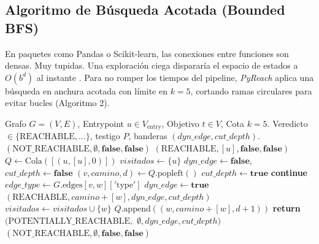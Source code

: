 \documentclass[conference]{IEEEtran}
\begin{document}
\subsection{Algoritmo de Búsqueda Acotada (Bounded BFS)}
En paquetes como Pandas o Scikit-learn, las conexiones entre funciones son densas. Muy tupidas. Una exploración ciega dispararía el espacio de estados a $O(b^d)$ al instante \cite{nielson1999principles}. Para no romper los tiempos del pipeline, \textit{PyReach} aplica una búsqueda en anchura acotada con límite en $k=5$, cortando ramas circulares para evitar bucles (Algoritmo 2).

\begin{algorithm}[t]
\caption{Búsqueda Acotada de Alcanzabilidad (\textit{Bounded BFS})}
\label{alg:bounded_bfs}
\begin{algorithmic}[1]
\REQUIRE Grafo $G=(V, E)$, Entrypoint $u \in V_{\text{entry}}$, Objetivo $t \in V$, Cota $k=5$.
\ENSURE Veredicto $\in \{\text{REACHABLE}, \dots\}$, testigo $P$, banderas $(\mathit{dyn\_edge}, \mathit{cut\_depth})$.
    \RETURN $(\text{NOT\_REACHABLE}, \emptyset, \mathbf{false}, \mathbf{false})$
\ENDIF
{}
    \RETURN $(\text{REACHABLE}, [u], \mathbf{false}, \mathbf{false})$
\ENDIF
\STATE $Q \leftarrow \text{Cola}([ (u, [u], 0) ])$
\STATE $\mathit{visitados} \leftarrow \{u\}$
\STATE $\mathit{dyn\_edge} \leftarrow \mathbf{false}$, $\mathit{cut\_depth} \leftarrow \mathbf{false}$
    \STATE $(v, \mathit{camino}, d) \leftarrow Q.\text{popleft}()$
            \STATE $\mathit{cut\_depth} \leftarrow \mathbf{true}$
        \ENDIF
        \STATE \textbf{continue}
    \ENDIF
        \STATE $\mathit{edge\_type} \leftarrow G.\text{edges}[v, w]['\text{type}']$
            \STATE $\mathit{dyn\_edge} \leftarrow \mathbf{true}$
        \ENDIF
            \RETURN $(\text{REACHABLE}, \mathit{camino} + [w], \mathit{dyn\_edge}, \mathit{cut\_depth})$
        \ENDIF
            \STATE $\mathit{visitados} \leftarrow \mathit{visitados} \cup \{w\}$
            \STATE $Q.\text{append}((w, \mathit{camino} + [w], d+1))$
        \ENDIF
    \ENDFOR
\ENDWHILE
{}
    \STATE \textbf{return} $(\text{POTENTIALLY\_REACHABLE},$
    \STATE \hspace{3.2em} $\emptyset, \mathit{dyn\_edge}, \mathit{cut\_depth})$
\ELSE
    \RETURN $(\text{NOT\_REACHABLE}, \emptyset, \mathbf{false}, \mathbf{false})$
\ENDIF
\end{algorithmic}
\end{algorithm}
\end{document}
